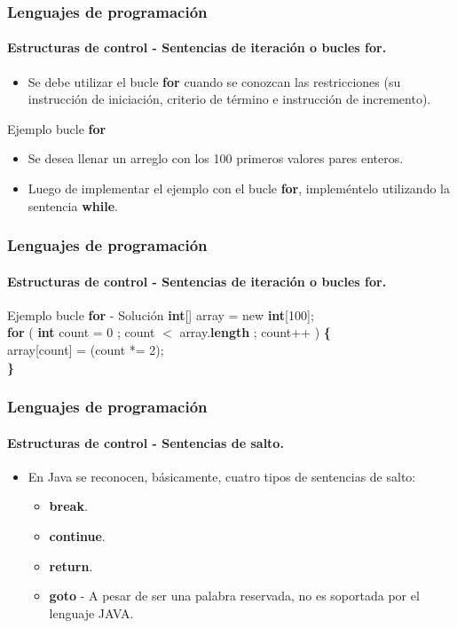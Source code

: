 \documentclass{beamer}
\begin{document}
		\begin{frame}
			\frametitle{Lenguajes de programaci\'on}
			\framesubtitle{Estructuras de control - Sentencias de iteraci\'on o bucles \textbf{for}.}

			\begin{itemize}
				\item Se debe utilizar el bucle \textbf{for} cuando se conozcan las restricciones (su instrucci\'on de iniciaci\'on, criterio de t\'ermino e instrucci\'on de incremento).
			\end{itemize}
			
			\begin{block}{Ejemplo bucle \textbf{for}}
				\begin{itemize}
					\item Se desea llenar un arreglo con los 100 primeros valores pares enteros.
					\item Luego de implementar el ejemplo con el bucle \textbf{for}, implem\'entelo utilizando la sentencia \textbf{while}.
				\end{itemize}
			\end{block}
		\end{frame}	

		\begin{frame}
			\frametitle{Lenguajes de programaci\'on}
			\framesubtitle{Estructuras de control - Sentencias de iteraci\'on o bucles \textbf{for}.}

			\begin{block}{Ejemplo bucle \textbf{for} - Soluci\'on}
				{\scriptsize
				\textbf{int}[] array = new \textbf{int}[100]; \\
				\vspace{0.3cm}
				\textbf{for} ( \textbf{int} count = 0 ; count $<$ array.\textbf{length} ; count++ ) \textbf{\{} \\
				\hspace{0.3cm} array[count] = (count *= 2); \\
				\textbf{\}}
				}
			\end{block}
		\end{frame}	

		\begin{frame}
			\frametitle{Lenguajes de programaci\'on}
			\framesubtitle{Estructuras de control - Sentencias de salto.}

			\begin{itemize}
				\item En Java se reconocen, b\'asicamente, cuatro tipos de sentencias de salto:
				\begin{itemize}
					\item \textbf{break}.
					\item \textbf{continue}.
					\item	\textbf{return}.
					\item \textbf{goto} - A pesar de ser una palabra reservada, no es soportada por el lenguaje JAVA.
				\end{itemize}
			\end{itemize}
		\end{frame}	
\end{document}
